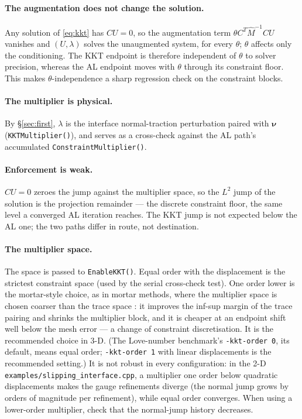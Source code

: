 \documentclass[11pt]{article}
\newcommand{\bnu}{\bm{\nu}}
\begin{document}
\paragraph{The augmentation does not change the solution.} Any solution
of \eqref{eq:kkt} has $CU = 0$, so the augmentation term
$\theta C^{T}\hat M^{-1}CU$ vanishes and $(U,\lambda)$ solves the
unaugmented system, for every $\theta$; $\theta$ affects only the
conditioning. The KKT endpoint is therefore independent of $\theta$ to
solver precision, whereas the AL endpoint moves with $\theta$ through
its constraint floor. This makes $\theta$-independence a sharp
regression check on the constraint blocks.

\paragraph{The multiplier is physical.} By \S\ref{sec:first}, $\lambda$
is the interface normal-traction perturbation paired with $\bnu$
(\texttt{KKTMultiplier()}), and serves as a cross-check against the AL path's
accumulated \texttt{ConstraintMultiplier()}.

\paragraph{Enforcement is weak.} $CU = 0$ zeroes the jump against the
multiplier space, so the $L^2$ jump of the solution is the projection
remainder --- the discrete constraint floor, the same level a converged
AL iteration reaches. The KKT jump is not expected below the AL one; the
two paths differ in route, not destination.

\paragraph{The multiplier space.} The space is passed to
\texttt{EnableKKT()}. Equal order with the displacement is the
strictest constraint space (used by the serial cross-check test). One
order lower is the mortar-style choice, as in mortar methods, where the
multiplier space is chosen coarser than the trace space
\cite{Wohlmuth2001}: it improves the inf-sup margin of the trace
pairing and shrinks the multiplier block, and it is cheaper at an
endpoint shift well below the mesh error --- a change of constraint
discretisation. It is the recommended choice in 3-D. (The Love-number
benchmark's \texttt{-kkt-order 0}, its default, means equal order;
\texttt{-kkt-order 1} with linear displacements is the recommended
setting.) It is not robust in every configuration: in the 2-D
\texttt{examples/slipping\_interface.cpp}, a multiplier one order
below quadratic displacements makes the gauge refinements diverge (the
normal jump grows by orders of magnitude per refinement), while equal
order converges. When using a lower-order multiplier, check that the
normal-jump history decreases.
\end{document}
